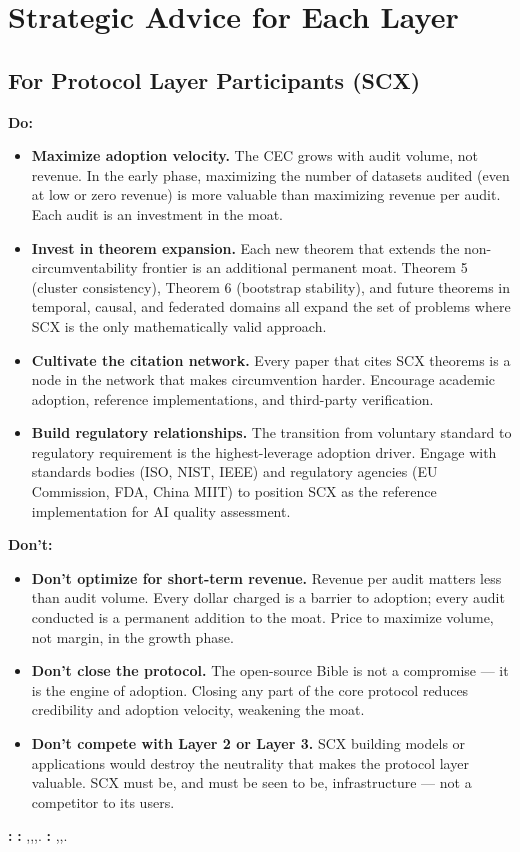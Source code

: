 \documentclass[12pt,a4paper]{article}
\theoremstyle{remark}
\begin{document}
\section{}
\section{Strategic Advice for Each Layer}
\subsection{For Protocol Layer Participants (SCX)}
\textbf{Do:}
\begin{itemize}
 \item \textbf{Maximize adoption velocity.} The CEC grows with audit volume, not 
 revenue. In the early phase, maximizing the number of datasets audited 
 (even at low or zero revenue) is more valuable than maximizing revenue 
 per audit. Each audit is an investment in the moat.
 \item \textbf{Invest in theorem expansion.} Each new theorem that extends the 
 non-circumventability frontier is an additional permanent moat. Theorem 5 
 (cluster consistency), Theorem 6 (bootstrap stability), and future theorems 
 in temporal, causal, and federated domains all expand the set of problems 
 where SCX is the only mathematically valid approach.
 \item \textbf{Cultivate the citation network.} Every paper that cites SCX theorems 
 is a node in the network that makes circumvention harder. Encourage academic 
 adoption, reference implementations, and third-party verification.
 \item \textbf{Build regulatory relationships.} The transition from voluntary 
 standard to regulatory requirement is the highest-leverage adoption driver. 
 Engage with standards bodies (ISO, NIST, IEEE) and regulatory agencies 
 (EU Commission, FDA, China MIIT) to position SCX as the reference 
 implementation for AI quality assessment.
\end{itemize}
\textbf{Don't:}
\begin{itemize}
 \item \textbf{Don't optimize for short-term revenue.} Revenue per audit matters 
 less than audit volume. Every dollar charged is a barrier to adoption; 
 every audit conducted is a permanent addition to the moat. Price to 
 maximize volume, not margin, in the growth phase.
 \item \textbf{Don't close the protocol.} The open-source Bible is not a 
 compromise --- it is the engine of adoption. Closing any part of the 
 core protocol reduces credibility and adoption velocity, weakening 
 the moat.
 \item \textbf{Don't compete with Layer 2 or Layer 3.} SCX building models or 
 applications would destroy the neutrality that makes the protocol layer 
 valuable. SCX must be, and must be seen to be, infrastructure --- not a 
 competitor to its users.
\end{itemize}
\noindent\textbf{: }
\textbf{: },,,.
\textbf{: },,.
\end{document}
